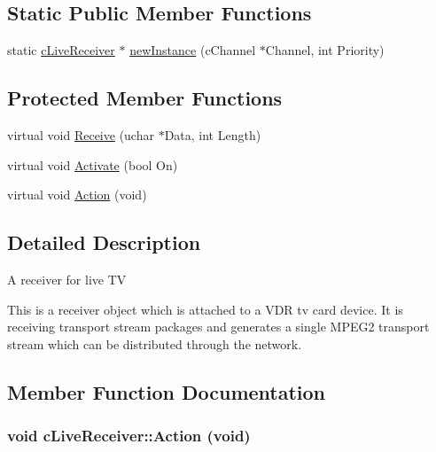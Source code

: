 \subsection*{Static Public Member Functions}
\begin{CompactItemize}
\item 
static \hyperlink{classcLiveReceiver}{cLiveReceiver} $\ast$ \hyperlink{classcLiveReceiver_1e28c50bb73404597b2363422e038c12}{newInstance} (cChannel $\ast$Channel, int Priority)
\end{CompactItemize}
\subsection*{Protected Member Functions}
\begin{CompactItemize}
\item 
virtual void \hyperlink{classcLiveReceiver_c8bc191994b0acd3fa2d23b26f996f8a}{Receive} (uchar $\ast$Data, int Length)
\item 
virtual void \hyperlink{classcLiveReceiver_631c7392c3226b07ba654875580fb26c}{Activate} (bool On)
\item 
virtual void \hyperlink{classcLiveReceiver_5c1f30f48fdc612c19ff4b9b4c176b07}{Action} (void)
\end{CompactItemize}


\subsection{Detailed Description}
A receiver for live TV

This is a receiver object which is attached to a VDR tv card device. It is receiving transport stream packages and generates a single MPEG2 transport stream which can be distributed through the network. 

\subsection{Member Function Documentation}
\hypertarget{classcLiveReceiver_5c1f30f48fdc612c19ff4b9b4c176b07}{
\subsubsection[{Action}]{\setlength{\rightskip}{0pt plus 5cm}void cLiveReceiver::Action (void)}}
\label{classcLiveReceiver_5c1f30f48fdc612c19ff4b9b4c176b07}


